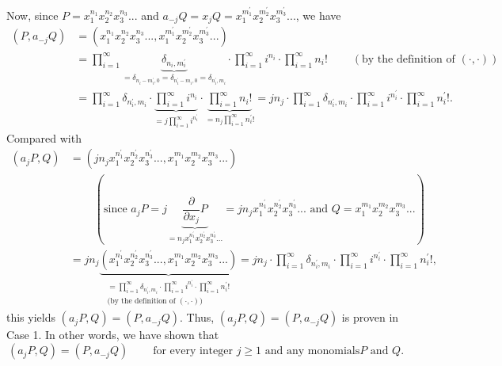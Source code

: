 \documentclass[etingof-lie.tex]{subfiles}
\begin{document}
Now, since $P=x_{1}^{n_{1}}x_{2}^{n_{2}}x_{3}^{n_{3}}...$ and $a_{-j}%
Q=x_{j}Q=x_{1}^{m_{1}^{\prime}}x_{2}^{m_{2}^{\prime}}x_{3}^{m_{3}^{\prime}%
}...$, we have%
\begin{align*}
\left(  P,a_{-j}Q\right)   &  =\left(  x_{1}^{n_{1}}x_{2}^{n_{2}}x_{3}^{n_{3}%
}...,x_{1}^{m_{1}^{\prime}}x_{2}^{m_{2}^{\prime}}x_{3}^{m_{3}^{\prime}%
}...\right) \\
&  =\prod\limits_{i=1}^{\infty}\underbrace{\delta_{n_{i},m_{i}^{\prime}}%
}_{=\delta_{n_{i}-m_{i}^{\prime},0}=\delta_{n_{i}^{\prime}-m_{i},0}%
=\delta_{n_{i}^{\prime},m_{i}}}\cdot\prod\limits_{i=1}^{\infty}i^{n_{i}}%
\cdot\prod\limits_{i=1}^{\infty}n_{i}!\ \ \ \ \ \ \ \ \ \ \left(  \text{by the
definition of }\left(  \cdot,\cdot\right)  \right) \\
&  =\prod\limits_{i=1}^{\infty}\delta_{n_{i}^{\prime},m_{i}}\cdot
\underbrace{\prod\limits_{i=1}^{\infty}i^{n_{i}}}_{=j\prod\limits_{i=1}%
^{\infty}i^{n_{i}^{\prime}}}\cdot\underbrace{\prod\limits_{i=1}^{\infty}%
n_{i}!}_{=n_{j}\prod\limits_{i=1}^{\infty}n_{i}^{\prime}!}=jn_{j}\cdot
\prod\limits_{i=1}^{\infty}\delta_{n_{i}^{\prime},m_{i}}\cdot\prod
\limits_{i=1}^{\infty}i^{n_{i}^{\prime}}\cdot\prod\limits_{i=1}^{\infty}%
n_{i}^{\prime}!.
\end{align*}
Compared with%
\begin{align*}
\left(  a_{j}P,Q\right)   &  =\left(  jn_{j}x_{1}^{n_{1}^{\prime}}x_{2}%
^{n_{2}^{\prime}}x_{3}^{n_{3}^{\prime}}...,x_{1}^{m_{1}}x_{2}^{m_{2}}%
x_{3}^{m_{3}}...\right) \\
&  \ \ \ \ \ \ \ \ \ \ \left(  \text{since }a_{j}P=j\underbrace{\dfrac
{\partial}{\partial x_{j}}P}_{=n_{j}x_{1}^{n_{1}^{\prime}}x_{2}^{n_{2}%
^{\prime}}x_{3}^{n_{3}^{\prime}}...}=jn_{j}x_{1}^{n_{1}^{\prime}}x_{2}%
^{n_{2}^{\prime}}x_{3}^{n_{3}^{\prime}}...\text{ and }Q=x_{1}^{m_{1}}%
x_{2}^{m_{2}}x_{3}^{m_{3}}...\right) \\
&  =jn_{j}\underbrace{\left(  x_{1}^{n_{1}^{\prime}}x_{2}^{n_{2}^{\prime}%
}x_{3}^{n_{3}^{\prime}}...,x_{1}^{m_{1}}x_{2}^{m_{2}}x_{3}^{m_{3}}...\right)
}_{\substack{=\prod\limits_{i=1}^{\infty}\delta_{n_{i}^{\prime},m_{i}}%
\cdot\prod\limits_{i=1}^{\infty}i^{n_{i}^{\prime}}\cdot\prod\limits_{i=1}%
^{\infty}n_{i}^{\prime}!\\\text{(by the definition of }\left(  \cdot
,\cdot\right)  \text{)}}}=jn_{j}\cdot\prod\limits_{i=1}^{\infty}\delta
_{n_{i}^{\prime},m_{i}}\cdot\prod\limits_{i=1}^{\infty}i^{n_{i}^{\prime}}%
\cdot\prod\limits_{i=1}^{\infty}n_{i}^{\prime}!,
\end{align*}
this yields $\left(  a_{j}P,Q\right)  =\left(  P,a_{-j}Q\right)  $. Thus,
$\left(  a_{j}P,Q\right)  =\left(  P,a_{-j}Q\right)  $ is proven in Case 1. In
other words, we have shown that%
\begin{equation}
\left(  a_{j}P,Q\right)  =\left(  P,a_{-j}Q\right)
\ \ \ \ \ \ \ \ \ \ \text{for every integer }j\geq1\text{ and any monomials
}P\text{ and }Q\text{.} \label{pf.A.contravariantform.1}%
\end{equation}
\end{document}
